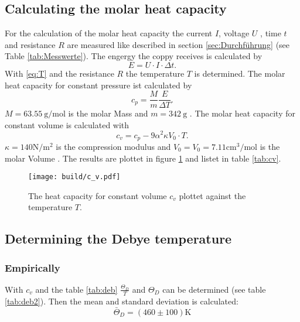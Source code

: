\subsection{Calculating the molar heat capacity}
For the calculation of the molar heat capacity 
the current $I$, voltage $U$ , time $t$ and resistance $R$ are measured 
like described in section \ref{sec:Durchführung} (see Table \ref{tab:Messwerte}).
\newline \newline
\noindent The engergy the coppy receives is calculated by 
\begin{equation}
    E = U \cdot I \cdot \Delta t .
\end{equation}
\noindent With \eqref{eq:T} and the resistance $R$ the temperature $T$ is determined.
The molar heat capacity for constant pressure ist calculated by
\begin{equation}
    c_p = \frac{ M}{m} \frac{E}{\Delta T}.
\end{equation}
\noindent $M = \SI{63.55}{\g\per\mole}$ is the molar Mass and
$m= \SI{342}{\g}$ \cite{Molmasse_kupfer}\cite{V47}.
The molar heat capacity for constant volume is calculated with 
\begin{equation}
    c_v = c_p - 9 \alpha^2 \kappa V_0 \cdot T.
\end{equation}
\noindent $\kappa = 140 \si{\N\per\square\m}$ is the compression modulus \cite{kappa_kupfer}
and $V_0 = V_0 =  7.11 \si{\cubic\cm\per\mole} $ is the molar Volume \cite{V0_kupfer}.
The results are plottet in figure \ref{fig:cv} and listet in table \ref{tab:cv}.

\begin{figure}
    \centering 
    \texttt{[image: build/c\_v.pdf]}
    \caption{The heat capacity for constant volume $c_v$ plottet against the temperature $T$.}
    \label{fig:cv}
\end{figure}

\subsection{Determining the Debye temperature}
\label{sub:deb}
\subsubsection{Empirically}
With $c_v$ and the table \ref{tab:deb}
$\frac{\Theta_D}{T}$ and $\Theta_D$ can be determined (see table \ref{tab:deb2}).
Then the mean and standard deviation is calculated:
\begin{equation*}
    \bar{\Theta}_D =  (460 \pm 100) \si{\kelvin}
\end{equation*}


